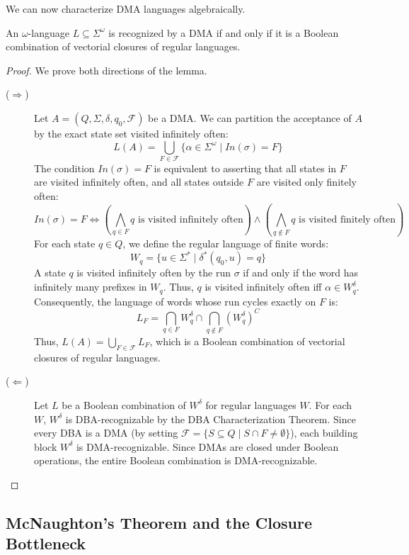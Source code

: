 We can now characterize DMA languages algebraically.

\begin{lemma}
An $\omega$-language $L \subseteq \Sigma^\omega$ is recognized by a DMA if and only if it is a Boolean combination of vectorial closures of regular languages.
\end{lemma}

\begin{proof}
We prove both directions of the lemma.
\begin{description}
    \item[($\Longrightarrow$)] Let $A = (Q, \Sigma, \delta, q_0, \mathcal{F})$ be a DMA. We can partition the acceptance of $A$ by the exact state set visited infinitely often:
    $$L(A) = \bigcup_{F \in \mathcal{F}} \{ \alpha \in \Sigma^\omega \mid In(\sigma) = F \}$$
    The condition $In(\sigma) = F$ is equivalent to asserting that all states in $F$ are visited infinitely often, and all states outside $F$ are visited only finitely often:
    $$In(\sigma) = F \iff \left( \bigwedge_{q \in F} q \text{ is visited infinitely often} \right) \land \left( \bigwedge_{q \notin F} q \text{ is visited finitely often} \right)$$
    For each state $q \in Q$, we define the regular language of finite words:
    $$W_q = \{ u \in \Sigma^* \mid \delta^*(q_0, u) = q \}$$
    A state $q$ is visited infinitely often by the run $\sigma$ if and only if the word has infinitely many prefixes in $W_q$. Thus, $q$ is visited infinitely often iff $\alpha \in W_q^\delta$.
    Consequently, the language of words whose run cycles exactly on $F$ is:
    $$L_F = \bigcap_{q \in F} W_q^\delta \cap \bigcap_{q \notin F} (W_q^\delta)^C$$
    Thus, $L(A) = \bigcup_{F \in \mathcal{F}} L_F$, which is a Boolean combination of vectorial closures of regular languages.
    
    \item[($\Longleftarrow$)] Let $L$ be a Boolean combination of $W^\delta$ for regular languages $W$. For each $W$, $W^\delta$ is DBA-recognizable by the DBA Characterization Theorem. Since every DBA is a DMA (by setting $\mathcal{F} = \{ S \subseteq Q \mid S \cap F \neq \emptyset \}$), each building block $W^\delta$ is DMA-recognizable. Since DMAs are closed under Boolean operations, the entire Boolean combination is DMA-recognizable.
\end{description}
\end{proof}

\subsection{McNaughton's Theorem and the Closure Bottleneck}
\label{subsec:mcnaughton-theorem}

